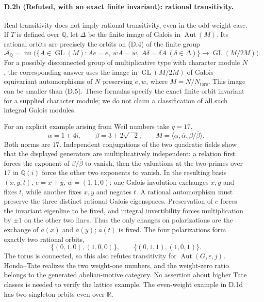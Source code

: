 \paragraph{D.2b (Refuted, with an exact finite invariant): rational transitivity.}
Real transitivity does not imply rational transitivity, even in the odd-weight
case. If $T$ is defined over $\mathbb Q$, let $\Delta$ be the finite image
of Galois in $\operatorname{Aut}(M)$. Its rational orbits are precisely the
orbits on (D.4) of the finite group
\[
 \overline{\mathcal A}_{\mathbb Q}
 =\operatorname{im}\bigl(\{A\in\operatorname{GL}(M):Ae=e,\ wA=w,
                    \ A\delta=\delta A\ (\delta\in\Delta)\}
              \longrightarrow\operatorname{GL}(M/2M)\bigr).
 \tag{D.5}
\]
For a possibly disconnected group of multiplicative type with character
module $N$, the corresponding answer uses the image in $\operatorname{GL}(M/2M)$
of Galois-equivariant automorphisms of $N$ preserving $e,w$, where
$M=N/N_{\mathrm{tors}}$. This image can be smaller than (D.5). These formulas
specify the exact finite orbit invariant for a supplied character module;
we do not claim a classification of all such integral Galois modules.

For an explicit example arising from Weil numbers take $q=17$,
\[
 \alpha=1+4i,\qquad \beta=3+2\sqrt{-2},\qquad
 M=\langle\alpha,\overline\alpha,\beta/\overline\beta\rangle.
\]
Both norms are $17$. Independent conjugations of the two quadratic fields
show that the displayed generators are multiplicatively independent:
a relation first forces the exponent of $\beta/\bar\beta$ to vanish,
then the valuations at the two primes over $17$ in $\mathbb Q(i)$ force
the other two exponents to vanish. In the resulting basis $(x,y,t)$,
$e=x+y$, $w=(1,1,0)$; one Galois involution exchanges $x,y$ and fixes $t$,
while another fixes $x,y$ and negates $t$. A rational automorphism must
preserve the three distinct rational Galois eigenspaces. Preservation of
$e$ forces the invariant eigenline to be fixed, and integral invertibility
forces multiplication by $\pm1$ on the other two lines. Thus the only
changes on polarizations are the exchange of $a(x)$ and $a(y)$; $a(t)$
is fixed. The four polarizations form exactly two rational orbits,
\[
 \{(0,1,0),(1,0,0)\},\qquad
 \{(0,1,1),(1,0,1)\}.
\]
The torus is connected, so this also refutes transitivity for
$\operatorname{Aut}(G,\varepsilon,j)$. Honda--Tate realizes the two
weight-one numbers, and the weight-zero ratio belongs to the generated
abelian-motive category. No assertion about higher Tate classes is needed
to verify the lattice example. The even-weight example in D.1d has two
singleton orbits even over $\mathbb R$.

